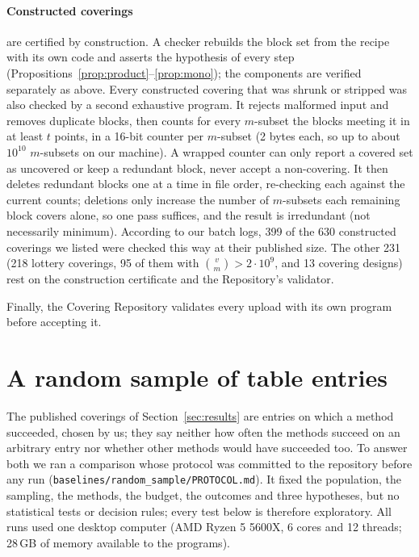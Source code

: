 \documentclass[11pt]{article}
\theoremstyle{remark}
\begin{document}
\paragraph{Constructed coverings} are certified by construction. A checker rebuilds the block set from the recipe with
its own code and asserts the hypothesis of every step (Propositions~\ref{prop:product}--\ref{prop:mono}); the
components are verified separately as above. Every constructed covering that was shrunk or stripped was also checked
by a second exhaustive program. It rejects malformed input and removes duplicate blocks, then counts for every $m$-subset the
blocks meeting it in at least $t$ points, in a 16-bit counter per $m$-subset (2 bytes each, so up to about
$10^{10}$ $m$-subsets on our machine). A wrapped counter can only report a covered set as uncovered or keep a
redundant block, never accept a non-covering. It then deletes redundant blocks one at a time in file order,
re-checking each against the current counts; deletions only increase the number of $m$-subsets each remaining block covers
alone, so one pass suffices, and the result is irredundant (not necessarily minimum). According to our batch logs, 399
of the 630 constructed coverings we listed were checked this way at their published size. The other 231 (218 lottery
coverings, 95 of them with $\binom{v}{m}>2\cdot 10^9$, and 13 covering designs) rest on the
construction certificate and the Repository's validator.

Finally, the Covering Repository validates every upload with its own program before accepting it.

\section{A random sample of table entries}\label{sec:random}

The published coverings of Section~\ref{sec:results} are entries on which a method succeeded, chosen by us; they say
neither how often the methods succeed on an arbitrary entry nor whether other methods would have succeeded too. To
answer both we ran a comparison whose protocol was committed to the repository before any run
(\texttt{baselines/random\_sample/PROTOCOL.md}). It fixed the population, the sampling, the methods, the budget, the
outcomes and three hypotheses, but no statistical tests or decision rules; every test below is therefore
exploratory. All runs used one desktop computer (AMD Ryzen 5 5600X, 6 cores and 12 threads; 28\,GB of memory
available to the programs).
\end{document}

